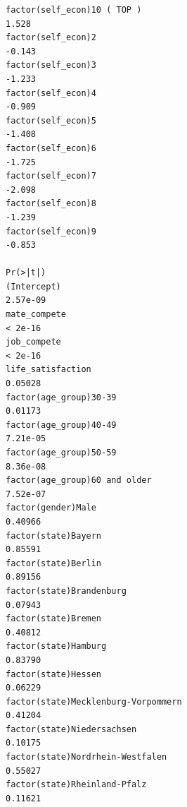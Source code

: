 \documentclass[
]{article}
\begin{document}
\begin{table}
\begin{minipage}[t]{\linewidth}
{\begin{verbatim}
factor(self_econ)10 ( TOP )                                                         1.528
factor(self_econ)2                                                                 -0.143
factor(self_econ)3                                                                 -1.233
factor(self_econ)4                                                                 -0.909
factor(self_econ)5                                                                 -1.408
factor(self_econ)6                                                                 -1.725
factor(self_econ)7                                                                 -2.098
factor(self_econ)8                                                                 -1.239
factor(self_econ)9                                                                 -0.853
                                                                                  Pr(>|t|)
(Intercept)                                                                       2.57e-09
mate_compete                                                                       < 2e-16
job_compete                                                                        < 2e-16
life_satisfaction                                                                  0.05028
factor(age_group)30-39                                                             0.01173
factor(age_group)40-49                                                            7.21e-05
factor(age_group)50-59                                                            8.36e-08
factor(age_group)60 and older                                                     7.52e-07
factor(gender)Male                                                                 0.40966
factor(state)Bayern                                                                0.85591
factor(state)Berlin                                                                0.89156
factor(state)Brandenburg                                                           0.07943
factor(state)Bremen                                                                0.40812
factor(state)Hamburg                                                               0.83790
factor(state)Hessen                                                                0.06229
factor(state)Mecklenburg-Vorpommern                                                0.41204
factor(state)Niedersachsen                                                         0.10175
factor(state)Nordrhein-Westfalen                                                   0.55027
factor(state)Rheinland-Pfalz                                                       0.11621

\end{verbatim}}
\end{minipage}
\end{table}
\end{document}
